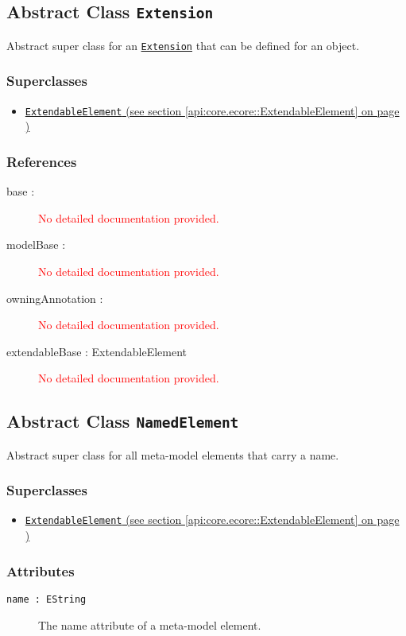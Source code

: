 \subsection{Abstract Class \texttt{Extension}}
\label{api:core.ecore::Extension}
Abstract super class for an \hyperref[Extension]{\texttt{Extension}} that can be defined for an object.
\subsubsection*{Superclasses}
\begin{itemize}
\item \hyperref[api:core.ecore::ExtendableElement]{\texttt{ExtendableElement} (see section \ref*{api:core.ecore::ExtendableElement} on page \pageref*{api:core.ecore::ExtendableElement})}
\end{itemize}
\subsubsection*{References}
\begin{description}
\item[base : ] \textcolor{red}{No detailed documentation provided.}
\item[modelBase : ] \textcolor{red}{No detailed documentation provided.}
\item[owningAnnotation : ] \textcolor{red}{No detailed documentation provided.}
\item[extendableBase : ExtendableElement] \textcolor{red}{No detailed documentation provided.}
\end{description}
\subsection{Abstract Class \texttt{NamedElement}}
\label{api:core.ecore::NamedElement}
Abstract super class for all meta-model elements that carry a name. 
\subsubsection*{Superclasses}
\begin{itemize}
\item \hyperref[api:core.ecore::ExtendableElement]{\texttt{ExtendableElement} (see section \ref*{api:core.ecore::ExtendableElement} on page \pageref*{api:core.ecore::ExtendableElement})}
\end{itemize}
\subsubsection*{Attributes}
\begin{description}
\item[\texttt{name~:~EString}] The name attribute of a meta-model element.
\end{description}
